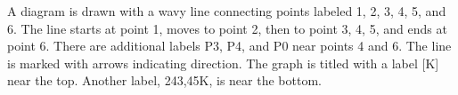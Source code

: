 A diagram is drawn with a wavy line connecting points labeled 1, 2, 3, 4, 5, and 6. The line starts at point 1, moves to point 2, then to point 3, 4, 5, and ends at point 6. There are additional labels P3, P4, and P0 near points 4 and 6. The line is marked with arrows indicating direction. The graph is titled with a label [K] near the top. Another label, 243,45K, is near the bottom.